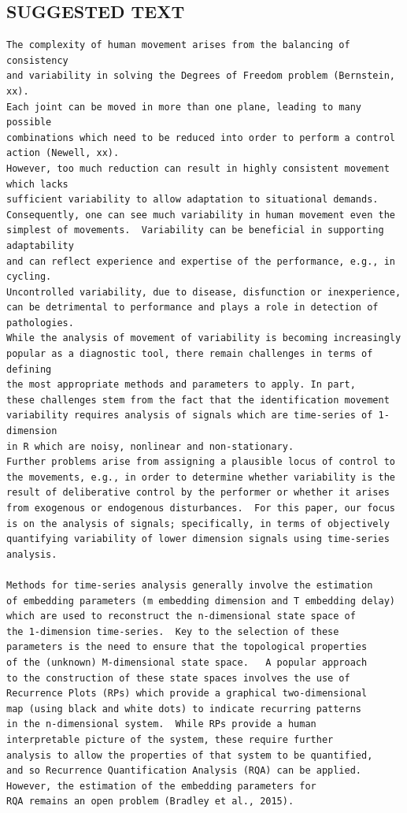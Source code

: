 \documentclass[10pt]{article}
\begin{document}
\subsection{SUGGESTED TEXT}
\begin{verbatim}
The complexity of human movement arises from the balancing of consistency 
and variability in solving the Degrees of Freedom problem (Bernstein, xx). 
Each joint can be moved in more than one plane, leading to many possible 
combinations which need to be reduced into order to perform a control action (Newell, xx). 
However, too much reduction can result in highly consistent movement which lacks 
sufficient variability to allow adaptation to situational demands. 
Consequently, one can see much variability in human movement even the 
simplest of movements.  Variability can be beneficial in supporting adaptability 
and can reflect experience and expertise of the performance, e.g., in cycling.  
Uncontrolled variability, due to disease, disfunction or inexperience, 
can be detrimental to performance and plays a role in detection of pathologies. 
While the analysis of movement of variability is becoming increasingly 
popular as a diagnostic tool, there remain challenges in terms of defining 
the most appropriate methods and parameters to apply. In part, 
these challenges stem from the fact that the identification movement 
variability requires analysis of signals which are time-series of 1-dimension 
in R which are noisy, nonlinear and non-stationary.  
Further problems arise from assigning a plausible locus of control to 
the movements, e.g., in order to determine whether variability is the 
result of deliberative control by the performer or whether it arises 
from exogenous or endogenous disturbances.  For this paper, our focus 
is on the analysis of signals; specifically, in terms of objectively 
quantifying variability of lower dimension signals using time-series analysis.

Methods for time-series analysis generally involve the estimation 
of embedding parameters (m embedding dimension and T embedding delay) 
which are used to reconstruct the n-dimensional state space of 
the 1-dimension time-series.  Key to the selection of these 
parameters is the need to ensure that the topological properties 
of the (unknown) M-dimensional state space.   A popular approach 
to the construction of these state spaces involves the use of 
Recurrence Plots (RPs) which provide a graphical two-dimensional 
map (using black and white dots) to indicate recurring patterns 
in the n-dimensional system.  While RPs provide a human 
interpretable picture of the system, these require further 
analysis to allow the properties of that system to be quantified, 
and so Recurrence Quantification Analysis (RQA) can be applied.  
However, the estimation of the embedding parameters for 
RQA remains an open problem (Bradley et al., 2015).


\end{verbatim}
\end{document}
